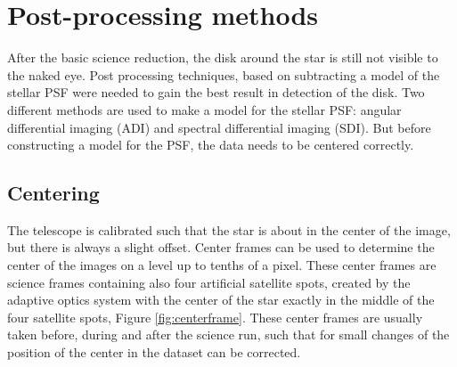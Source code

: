 \documentclass[twoside,single]{lion-msc}
\begin{document}
\section{Post-processing methods}
After the basic science reduction, the disk around the star is still not visible to the naked eye. Post processing techniques, based on subtracting a model of the stellar PSF were needed to gain the best result in detection of the disk. Two different methods are used to make a model for the stellar PSF: angular differential imaging (ADI) and spectral differential imaging (SDI). But before constructing a model for the PSF, the data needs to be centered correctly.

\subsection{Centering}
The telescope is calibrated such that the star is about in the center of the image, but there is always a slight offset. Center frames can be used to determine the center of the images on a level up to tenths of a pixel. These center frames are science frames containing also four artificial satellite spots, created by the adaptive optics system with the center of the star exactly in the middle of the four satellite spots, Figure \ref{fig:centerframe}. These center frames are usually taken before, during and after the science run, such that for small changes of the position of the center in the dataset can be corrected. 
\end{document}
